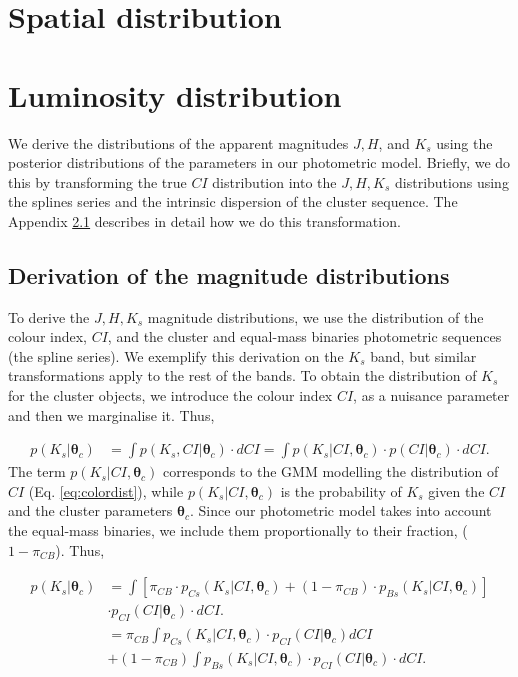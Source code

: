 \section{Spatial distribution}
\section{Luminosity distribution}
We derive the distributions of the apparent magnitudes $J,H$, and $K_s$ using the posterior distributions of the parameters in our photometric model. Briefly, we do this by transforming the true $CI$ distribution into the $J,H,K_s$ distributions using the splines series and the intrinsic dispersion of the cluster sequence. The Appendix \ref{subsect:deriveluminosity} describes in detail how we do this transformation.

\subsection{Derivation of the magnitude distributions}
\label{subsect:deriveluminosity}
To derive the $J,H,K_s$ magnitude distributions, we use the distribution of the colour index, $CI$, and the cluster and equal-mass binaries photometric sequences (the spline series). We exemplify this derivation on the $K_s$ band, but similar transformations apply to the rest of the bands. To obtain the distribution of $K_s$ for the cluster objects, we introduce the colour index $CI$, as a nuisance parameter and then we marginalise it. Thus, 

\begin{align}
p(K_s | \boldsymbol{\theta}_c) & = \int p(K_s,CI | \boldsymbol{\theta}_c) \cdot dCI =  \int p(K_s | CI ,\boldsymbol{\theta}_c) \cdot p(CI|\boldsymbol{\theta}_c)\cdot dCI. \nonumber
\end{align}
The term $p(K_s | CI ,\boldsymbol{\theta}_c)$ corresponds to the GMM modelling the distribution of $CI$ (Eq. \ref{eq:colordist}), while $p(K_s | CI ,\boldsymbol{\theta}_c)$ is the probability of $K_s$ given the $CI$ and the cluster parameters $\boldsymbol{\theta}_c$. Since our photometric model takes into account the equal-mass binaries, we include them proportionally to their fraction, ($1-\pi_{CB}$). Thus,

\begin{align}
p(K_s | \boldsymbol{\theta}_c) & =  \int \left[\pi_{CB}\cdot p_{Cs}(K_s| CI, \boldsymbol{\theta}_c) + (1-\pi_{CB})\cdot p_{Bs}(K_s| CI, \boldsymbol{\theta}_c)\right]\nonumber \\& \cdot p_{CI}(CI|\boldsymbol{\theta}_c)\cdot dCI. \nonumber \\
& =   \pi_{CB} \int p_{Cs}(K_s| CI, \boldsymbol{\theta}_c) \cdot p_{CI}(CI|\boldsymbol{\theta}_c) dCI \nonumber \\
&+ (1-\pi_{CB})\int p_{Bs}(K_s| CI, \boldsymbol{\theta}_c) \cdot p_{CI}(CI|\boldsymbol{\theta}_c)\cdot  dCI. \nonumber \\
\end{align}

